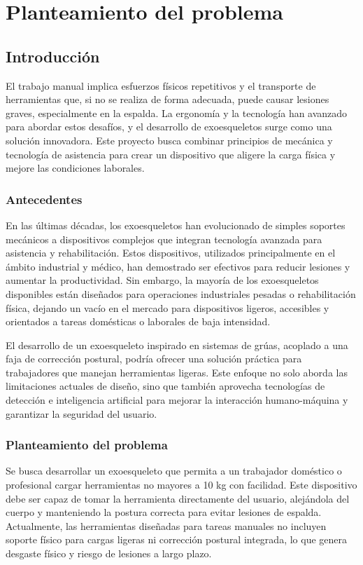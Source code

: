 \chapter{Planteamiento del problema}
\section{Introducción}
El trabajo manual implica esfuerzos físicos repetitivos y el transporte de herramientas que, si no se realiza de forma adecuada, puede causar lesiones graves, especialmente en la espalda. La ergonomía y la tecnología han avanzado para abordar estos desafíos, y el desarrollo de exoesqueletos surge como una solución innovadora. Este proyecto busca combinar principios de mecánica y tecnología de asistencia para crear un dispositivo que aligere la carga física y mejore las condiciones laborales.

\subsection{Antecedentes} %
En las últimas décadas, los exoesqueletos han evolucionado de simples soportes mecánicos a dispositivos complejos que integran tecnología avanzada para asistencia y rehabilitación. Estos dispositivos, utilizados principalmente en el ámbito industrial y médico, han demostrado ser efectivos para reducir lesiones y aumentar la productividad. Sin embargo, la mayoría de los exoesqueletos disponibles están diseñados para operaciones industriales pesadas o rehabilitación física, dejando un vacío en el mercado para dispositivos ligeros, accesibles y orientados a tareas domésticas o laborales de baja intensidad.

El desarrollo de un exoesqueleto inspirado en sistemas de grúas, acoplado a una faja de corrección postural, podría ofrecer una solución práctica para trabajadores que manejan herramientas ligeras. Este enfoque no solo aborda las limitaciones actuales de diseño, sino que también aprovecha tecnologías de detección e inteligencia artificial para mejorar la interacción humano-máquina y garantizar la seguridad del usuario.


\subsection{Planteamiento del problema}
Se busca desarrollar un exoesqueleto que permita a un trabajador doméstico o profesional cargar herramientas no mayores a 10 kg con facilidad. Este dispositivo debe ser capaz de tomar la herramienta directamente del usuario, alejándola del cuerpo y manteniendo la postura correcta para evitar lesiones de espalda. Actualmente, las herramientas diseñadas para tareas manuales no incluyen soporte físico para cargas ligeras ni corrección postural integrada, lo que genera desgaste físico y riesgo de lesiones a largo plazo.

